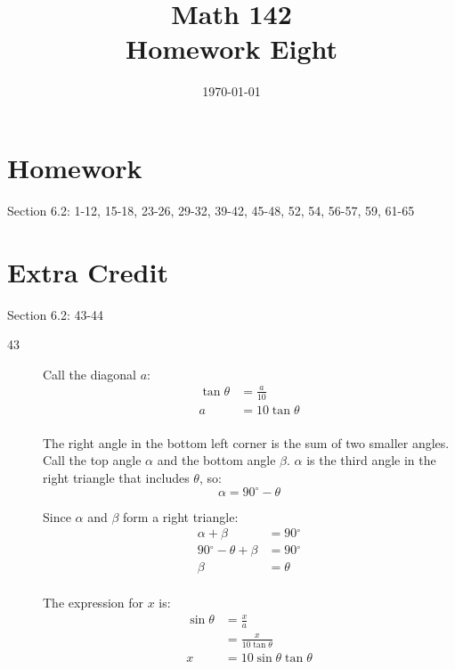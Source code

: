 \documentclass{exam}
\author{}
\date{\today}
\title{Math 142 \\ Homework Eight}
\newcommand{\dg}{\ensuremath{^\circ}}
\begin{document}
  \maketitle

  \section{Homework}
  Section 6.2: 1-12, 15-18, 23-26, 29-32, 39-42, 45-48, 52, 54, 56-57, 59, 61-65

  \section{Extra Credit}
  Section 6.2: 43-44

  \ifprintanswers
    \begin{description}
      \item[43]
        Call the diagonal $a$:
        \begin{align*}
          \tan \theta & = \frac{a}{10} \\
          a           & = 10 \tan \theta \\
        \end{align*}

        The right angle in the bottom left corner is the sum of two smaller angles.  Call the top angle $\alpha$ and the
        bottom angle $\beta$.  $\alpha$ is the third angle in the right triangle that includes $\theta$, so:
        \[
          \alpha = 90 \dg - \theta
        \]

        Since $\alpha$ and $\beta$ form a right triangle:
        \begin{align*}
          \alpha + \beta          & = 90 \dg \\
          90 \dg - \theta + \beta & = 90 \dg \\
          \beta                   & = \theta \\
        \end{align*}

        The expression for $x$ is:
        \begin{align*}
          \sin \theta & = \frac{x}{a} \\
                      & = \frac{x}{10 \tan \theta} \\
          x           & = \boxed{ 10 \sin \theta \tan \theta } \\
        \end{align*}


\end{description}
\end{document}
